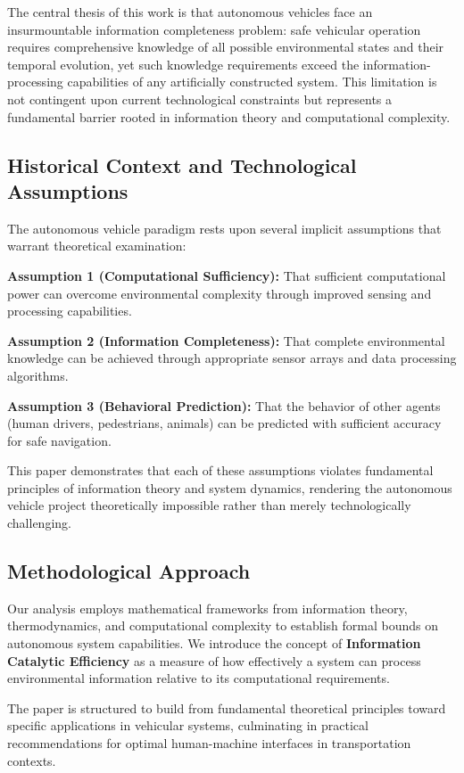 \documentclass[12pt,a4paper]{article}
\begin{document}
The central thesis of this work is that autonomous vehicles face an insurmountable information completeness problem: safe vehicular operation requires comprehensive knowledge of all possible environmental states and their temporal evolution, yet such knowledge requirements exceed the information-processing capabilities of any artificially constructed system. This limitation is not contingent upon current technological constraints but represents a fundamental barrier rooted in information theory and computational complexity.

\subsection{Historical Context and Technological Assumptions}

The autonomous vehicle paradigm rests upon several implicit assumptions that warrant theoretical examination:

\textbf{Assumption 1 (Computational Sufficiency):} That sufficient computational power can overcome environmental complexity through improved sensing and processing capabilities.

\textbf{Assumption 2 (Information Completeness):} That complete environmental knowledge can be achieved through appropriate sensor arrays and data processing algorithms.

\textbf{Assumption 3 (Behavioral Prediction):} That the behavior of other agents (human drivers, pedestrians, animals) can be predicted with sufficient accuracy for safe navigation.

This paper demonstrates that each of these assumptions violates fundamental principles of information theory and system dynamics, rendering the autonomous vehicle project theoretically impossible rather than merely technologically challenging.

\subsection{Methodological Approach}

Our analysis employs mathematical frameworks from information theory, thermodynamics, and computational complexity to establish formal bounds on autonomous system capabilities. We introduce the concept of \textbf{Information Catalytic Efficiency} as a measure of how effectively a system can process environmental information relative to its computational requirements.

The paper is structured to build from fundamental theoretical principles toward specific applications in vehicular systems, culminating in practical recommendations for optimal human-machine interfaces in transportation contexts.
\end{document}
